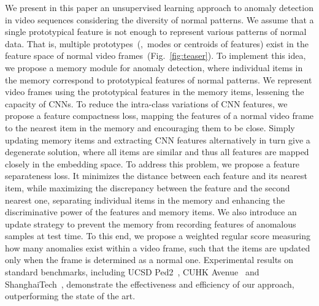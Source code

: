 \documentclass[10pt,twocolumn,letterpaper]{article}
\begin{document}
	





We present in this paper an unsupervised learning approach to anomaly detection in video sequences considering the diversity of normal patterns. We assume that a single prototypical feature is not enough to represent various patterns of normal data. That is, multiple prototypes~(\ie,~modes or centroids of features) exist in the feature space of normal video frames~(Fig.~\ref{fig:teaser}). To implement this idea, we propose a memory module for anomaly detection, where individual items in the memory correspond to prototypical features of normal patterns. We represent video frames using the prototypical features in the memory items, lessening the capacity of CNNs. To reduce the intra-class variations of CNN features, we propose a feature compactness loss, mapping the features of a normal video frame to the nearest item in the memory and encouraging them to be close. Simply updating memory items and extracting CNN features alternatively in turn give a degenerate solution, where all items are similar and thus all features are mapped closely in the embedding space. To address this problem, we propose a feature separateness loss. It minimizes the distance between each feature and its nearest item, while maximizing the discrepancy between the feature and the second nearest one, separating individual items in the memory and enhancing the discriminative power of the features and memory items. We also introduce an update strategy to prevent the memory from recording features of anomalous samples at test time. To this end, we propose a weighted regular score measuring how many anomalies exist within a video frame, such that the items are updated only when the frame is determined as a normal one. Experimental results on standard benchmarks, including UCSD Ped2~\cite{li2013anomaly}, CUHK Avenue~\cite{lu2013abnormal} and ShanghaiTech~\cite{luo2017revisit}, demonstrate the effectiveness and efficiency of our approach, outperforming the state of the art. 
\end{document}
